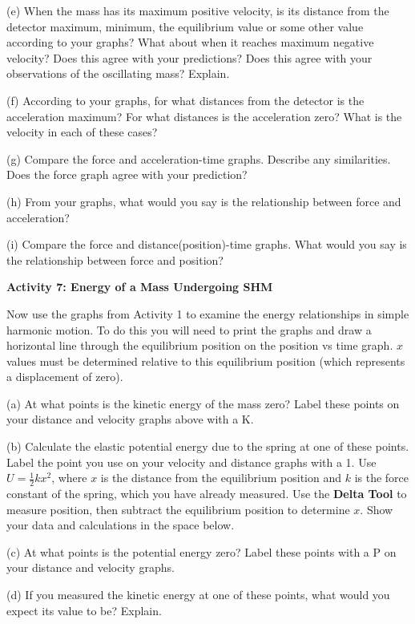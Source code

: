 (e) When the mass has its maximum positive velocity, is its distance from the
detector maximum, minimum, the equilibrium value or some other value according
to your graphs? What about when it reaches maximum negative velocity? Does this
agree with your predictions? Does this agree with your observations of the 
oscillating mass? Explain. 
\answerspace{10mm}

\pagebreak[2]
(f) According to your graphs, for what distances from the detector is the 
acceleration maximum? For what distances is the acceleration zero? What is the 
velocity in each of these cases?
\answerspace{20mm}

(g) Compare the force and acceleration-time graphs. Describe any similarities.
Does the force graph agree with your prediction?
\answerspace{20mm}

(h) From your graphs, what would you say is the relationship between force and
acceleration? 
\answerspace{20mm}

(i) Compare the force and distance(position)-time graphs. What would you say
is the relationship between force and position? 
\answerspace{20mm}

\textbf{Activity 7: Energy of a Mass Undergoing SHM }

Now use the graphs from Activity 1 to examine the energy relationships
in simple harmonic motion. To do this you will need to print the graphs and draw a horizontal line through the equilibrium position on the position vs time graph.  $x$ values must be determined relative to this equilibrium position (which represents a displacement of zero).

(a) At what points is the kinetic energy of the mass zero? Label these points
on your distance and velocity graphs above with a K.

(b) Calculate the elastic potential energy due to the spring at one of these
points. Label the point you use on your velocity and distance graphs with a
1. Use $U = \frac{1}{2}kx^{2}$, where  $x$ is the distance from the equilibrium 
position and $k$ is the force constant of the spring, which you have already 
measured. Use the \textbf{Delta Tool} to measure position, then subtract the 
equilibrium position to determine $x$. Show your data and calculations 
in the space below. 
\answerspace{20mm}

(c) At what points is the potential energy zero? Label these points with a P
on your distance and velocity graphs.

(d) If you measured the kinetic energy at one of these points, what would you
expect its value to be? Explain.
\answerspace{15mm}

